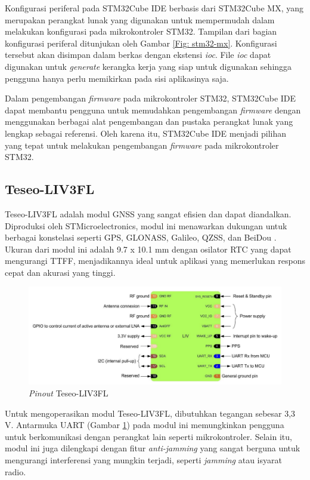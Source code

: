 Konfigurasi periferal pada STM32Cube IDE berbasis dari STM32Cube MX, yang merupakan perangkat lunak yang digunakan untuk mempermudah dalam melakukan konfigurasi pada mikrokontroler STM32. Tampilan dari bagian konfigurasi periferal ditunjukan oleh Gambar \ref{Fig: stm32-mx}. Konfigurasi tersebut akan disimpan dalam berkas dengan ekstensi \textit{ioc}. File \textit{ioc} dapat digunakan untuk \textit{generate} kerangka kerja yang siap untuk digunakan sehingga pengguna hanya perlu memikirkan pada sisi aplikasinya saja.

Dalam pengembangan \textit{firmware} pada mikrokontroler STM32, STM32Cube IDE dapat membantu pengguna untuk memudahkan pengembangan \textit{firmware} dengan menggunakan berbagai alat pengembangan dan pustaka perangkat lunak yang lengkap sebagai referensi. Oleh karena itu, STM32Cube IDE menjadi pilihan yang tepat untuk melakukan pengembangan \textit{firmware} pada mikrokontroler STM32.

\subsection{Teseo-LIV3FL}
Teseo-LIV3FL adalah modul GNSS yang sangat efisien dan dapat diandalkan. Diproduksi oleh STMicroelectronics, modul ini menawarkan dukungan untuk berbagai konstelasi seperti GPS, GLONASS, Galileo, QZSS, dan BeiDou \cite{STMicroelectronics2022}. Ukuran dari modul ini adalah 9.7 x 10.1 mm dengan osilator RTC yang dapat mengurangi TTFF, menjadikannya ideal untuk aplikasi yang memerlukan respons cepat dan akurasi yang tinggi.

\begin{figure}[H]
	\centering
	\includegraphics[width=13cm]{contents/chapter-2/teseo_pinout.png}
	\caption{\textit{Pinout} Teseo-LIV3FL \cite{STMicroelectronics2022}}
	\label{Fig: teseo_pinout}
\end{figure}

Untuk mengoperasikan modul Teseo-LIV3FL, dibutuhkan tegangan sebesar 3,3 V. Antarmuka UART (Gambar \ref{Fig: teseo_pinout}) pada modul ini memungkinkan pengguna untuk berkomunikasi dengan perangkat lain seperti mikrokontroler. Selain itu, modul ini juga dilengkapi dengan fitur \textit{anti-jamming} yang sangat berguna untuk mengurangi interferensi yang mungkin terjadi, seperti \textit{jamming} atau isyarat radio.

